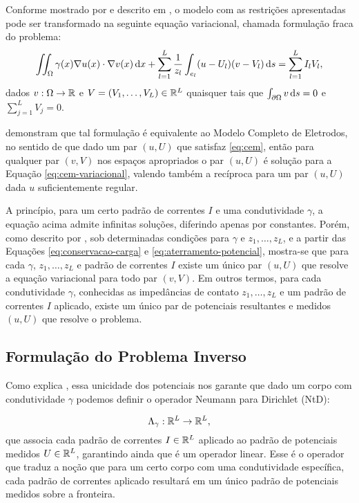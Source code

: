 Conforme mostrado por  e descrito em , o modelo com as restrições apresentadas pode ser transformado na seguinte equação variacional, chamada formulação fraca do problema:
\begin{equation}\label{eq:cem-variacional}
    \iint_\Omega \gamma (x) \nabla u(x) \cdot \nabla v(x)\mathop{}\!\mathrm{d} x + \sum_{l=1}^L \frac{1}{z_l}\int_{e_l} (u-U_l)(v - V_l)\mathop{}\!\mathrm{d} s = \sum_{l=1}^L I_l V_l,
\end{equation}
dados $v : \Omega \to \mathbb{R}$ e $V = (V_1,\dots, V_L)\in \mathbb{R}^L$ quaisquer tais que $\int_{\partial \Omega} v \mathop{}\!\mathrm{d} s = 0$ e $\sum_{j=1}^L V_j = 0$.

 demonstram que tal formulação é equivalente ao Modelo Completo de Eletrodos, no sentido de que dado um par $(u,U)$ que satisfaz \eqref{eq:cem}, então para qualquer par $(v,V)$ nos espaços apropriados o par $(u,U)$ é solução para a Equação \eqref{eq:cem-variacional}, valendo também a recíproca para um par $(u,U)$ dada $u$ suficientemente regular. 

A princípio, para um certo padrão de correntes $I$ e uma condutividade $\gamma$, a equação acima admite infinitas soluções, diferindo apenas por constantes. Porém, como descrito por , sob determinadas condições para $\gamma$ e $z_1,\dots,z_L$, e a partir das Equações \eqref{eq:conservacao-carga} e \eqref{eq:aterramento-potencial}, mostra-se que para cada $\gamma$, $z_1,\dots,z_L$ e padrão de correntes $I$ existe um único par $(u,U)$ que resolve a equação variacional para todo par $(v,V)$. Em outros termos, para cada condutividade $\gamma$, conhecidas as impedâncias de contato $z_1, …, z_L$ e um padrão de correntes $I$ aplicado, existe um único par de potenciais resultantes e medidos $(u,U)$ que resolve o problema.

\subsection{Formulação do Problema Inverso}

Como explica , essa unicidade dos potenciais nos garante que dado um corpo com condutividade $\gamma$ podemos definir o operador Neumann para Dirichlet (NtD):

 \begin{equation}
     \Lambda_\gamma : \mathbb{R}^L \to \mathbb{R}^L,
 \end{equation}
 que associa cada padrão de correntes $I \in \mathbb{R}^L$ aplicado ao padrão de potenciais medidos $U\in \mathbb{R}^L$, garantindo ainda que é um operador linear. Esse é o operador que traduz a noção que para um certo corpo com uma condutividade específica, cada padrão de correntes aplicado resultará em um único padrão de potenciais medidos sobre a fronteira. 

